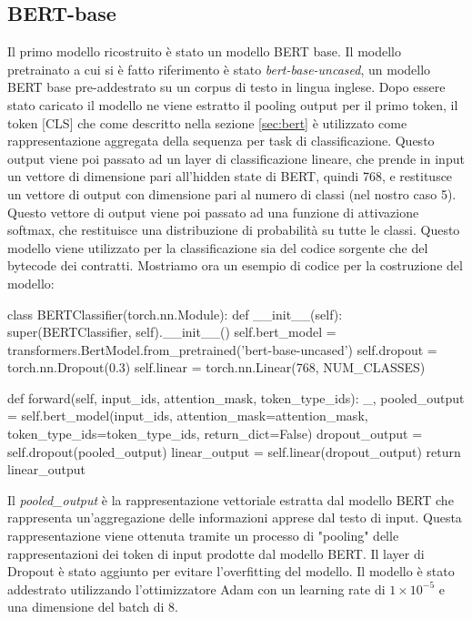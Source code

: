 \documentclass[../../Thesis.tex]{subfiles}
\begin{document}
\subsection{BERT-base}
Il primo modello ricostruito è stato un modello BERT base. Il modello pretrainato a cui si è fatto riferimento è stato \textit{bert-base-uncased}, un modello BERT base pre-addestrato su un corpus di testo in lingua inglese. Dopo essere stato caricato il modello ne viene estratto il pooling output per il primo token, il token [CLS] che come descritto nella sezione \ref{sec:bert} è utilizzato come rappresentazione aggregata della sequenza per task di classificazione. Questo output viene poi passato ad un layer di classificazione lineare, che prende in input un vettore di dimensione pari all'hidden state di BERT, quindi 768, e restitusce un vettore di output con dimensione pari al numero di classi (nel nostro caso 5). Questo vettore di output viene poi passato ad una funzione di attivazione softmax, che restituisce una distribuzione di probabilità su tutte le classi. Questo modello viene utilizzato per la classificazione sia del codice sorgente che del bytecode dei contratti. Mostriamo ora un esempio di codice per la costruzione del modello: 
\begin{python}
    class BERTClassifier(torch.nn.Module):
    def __init__(self):
        super(BERTClassifier, self).__init__()
        self.bert_model = transformers.BertModel.from_pretrained('bert-base-uncased')
        self.dropout = torch.nn.Dropout(0.3)
        self.linear = torch.nn.Linear(768, NUM_CLASSES)
    
    def forward(self, input_ids, attention_mask, token_type_ids):
        _, pooled_output = self.bert_model(input_ids, attention_mask=attention_mask, token_type_ids=token_type_ids, return_dict=False)
        dropout_output = self.dropout(pooled_output)
        linear_output = self.linear(dropout_output)
        return linear_output
\end{python}
Il \emph{pooled_output} è la rappresentazione vettoriale estratta dal modello BERT che rappresenta un'aggregazione delle informazioni apprese dal testo di input. Questa rappresentazione viene ottenuta tramite un processo di "pooling" delle rappresentazioni dei token di input prodotte dal modello BERT.
Il layer di Dropout è stato aggiunto per evitare l'overfitting del modello. Il modello è stato addestrato utilizzando l'ottimizzatore Adam con un learning rate di $1 \times 10^{-5}$ e una dimensione del batch di 8.
\end{document}
